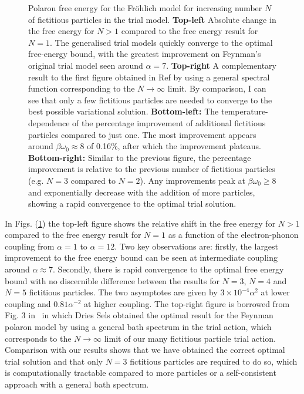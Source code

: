 \begin{figure}[!tbp]
  \caption{Polaron free energy for the Fr\"ohlich model for increasing number $N$ of fictitious particles in the trial model. \textbf{Top-left} Absolute change in the free energy for $N>1$ compared to the free energy result for $N=1$. The generalised trial models quickly converge to the optimal free-energy bound, with the greatest improvement on Feynman's original trial model seen around $\alpha = 7$. \textbf{Top-right} A complementary result to the first figure obtained in Ref{} by using a general spectral function corresponding to the $N\to\infty$ limit. By comparison, I can see that only a few fictitious particles are needed to converge to the best possible variational solution. \textbf{Bottom-left:} The temperature-dependence of the percentage improvement of additional fictitious particles compared to just one. The most improvement appears around $\beta\omega_0 \approx 8$ of 0.16\%, after which the improvement plateaus. \textbf{Bottom-right:} Similar to the previous figure, the percentage improvement is relative to the previous number of fictitious particles (e.g. $N=3$ compared to $N=2$). Any improvements peak at $\beta\omega_0 \geq 8$ and exponentially decrease with the addition of more particles, showing a rapid convergence to the optimal trial solution.}
  \label{fig:multienergy}
\end{figure}

In Figs. (\ref{fig:multienergy}) the top-left figure shows the relative shift in the free energy for $N>1$ compared to the free energy result for $N=1$ as a function of the electron-phonon coupling from $\alpha=1$ to $\alpha=12$. Two key observations are: firstly, the largest improvement to the free energy bound can be seen at intermediate coupling around $\alpha \approx 7$. Secondly, there is rapid convergence to the optimal free energy bound with no discernible difference between the results for $N=3$, $N=4$ and $N=5$ fictitious particles. The two asymptotes are given by $3 \times 10^{-4} \alpha^2$ at lower coupling and $0.81 \alpha^{-2}$ at higher coupling. The top-right figure is borrowed from Fig. 3 in~\cite{sels_dynamic_2016} in which Dries Sels obtained the optimal result for the Feynman polaron model by using a general bath spectrum in the trial action, which corresponds to the $N\to\infty$ limit of our many fictitious particle trial action. Comparison with our results shows that we have obtained the correct optimal trial solution and that only $N=3$ fictitious particles are required to do so, which is computationally tractable compared to more particles or a self-consistent approach with a general bath spectrum.


